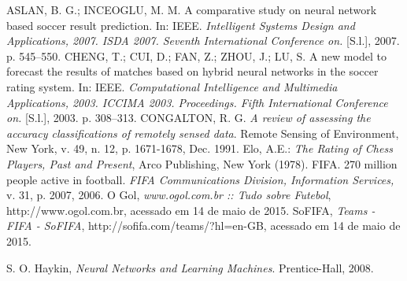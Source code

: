 \documentclass{article}
\begin{document}
	
	\begin{thebibliography}{8}
		ASLAN, B. G.; INCEOGLU, M. M. A comparative study on neural network based soccer
		result prediction. In: IEEE. \emph{Intelligent Systems Design and Applications, 2007. ISDA
			2007. Seventh International Conference on.} [S.l.], 2007. p. 545–550.
		CHENG, T.; CUI, D.; FAN, Z.; ZHOU, J.; LU, S. A new model to forecast the results of matches based on hybrid neural networks in the soccer rating system. In: IEEE. \emph{Computational Intelligence and Multimedia Applications, 2003. ICCIMA 2003. Proceedings. Fifth International Conference on.} [S.l.], 2003. p. 308–313.
		CONGALTON, R. G. \emph{A review of assessing the accuracy classifications of
			remotely sensed data}. Remote Sensing of Environment, New York, v. 49, n. 12, p.
		1671-1678, Dec. 1991.
		Elo, A.E.: \emph{The Rating of Chess Players, Past and Present}, Arco Publishing, New York (1978).
		FIFA. 270 million people active in football. \emph{FIFA Communications Division, Information Services,} v. 31, p. 2007, 2006.
		O Gol, \emph{www.ogol.com.br :: Tudo sobre Futebol}, http://www.ogol.com.br, acessado em 14 de maio de 2015.
		SoFIFA, \emph{Teams - FIFA - SoFIFA}, http://sofifa.com/teams/?hl=en-GB, acessado em 14 de maio de 2015.
		
		S. O. Haykin, \emph{Neural Networks and Learning Machines}. Prentice-Hall, 2008.
	\end{thebibliography}
		
\end{document}
